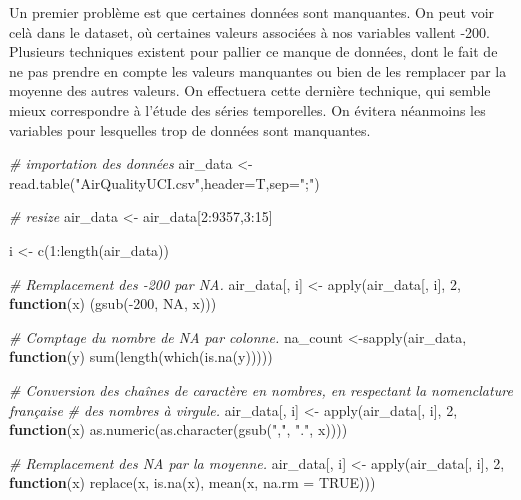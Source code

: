 \documentclass[
]{article}
\newenvironment{Shaded}{\begin{snugshade}}{\end{snugshade}}
\newcommand{\AttributeTok}[1]{\textcolor[rgb]{0.77,0.63,0.00}{#1}}
\newcommand{\CommentTok}[1]{\textcolor[rgb]{0.56,0.35,0.01}{\textit{#1}}}
\newcommand{\ConstantTok}[1]{\textcolor[rgb]{0.00,0.00,0.00}{#1}}
\newcommand{\ControlFlowTok}[1]{\textcolor[rgb]{0.13,0.29,0.53}{\textbf{#1}}}
\newcommand{\DecValTok}[1]{\textcolor[rgb]{0.00,0.00,0.81}{#1}}
\newcommand{\FunctionTok}[1]{\textcolor[rgb]{0.00,0.00,0.00}{#1}}
\newcommand{\NormalTok}[1]{#1}
\newcommand{\OtherTok}[1]{\textcolor[rgb]{0.56,0.35,0.01}{#1}}
\newcommand{\SpecialCharTok}[1]{\textcolor[rgb]{0.00,0.00,0.00}{#1}}
\newcommand{\StringTok}[1]{\textcolor[rgb]{0.31,0.60,0.02}{#1}}
\begin{document}
Un premier problème est que certaines données sont manquantes. On peut
voir celà dans le dataset, où certaines valeurs associées à nos
variables vallent -200. Plusieurs techniques existent pour pallier ce
manque de données, dont le fait de ne pas prendre en compte les valeurs
manquantes ou bien de les remplacer par la moyenne des autres valeurs.
On effectuera cette dernière technique, qui semble mieux correspondre à
l'étude des séries temporelles. On évitera néanmoins les variables pour
lesquelles trop de données sont manquantes.

\begin{Shaded}
\begin{Highlighting}[]
\CommentTok{\# importation des données}
\NormalTok{air\_data }\OtherTok{\textless{}{-}} \FunctionTok{read.table}\NormalTok{(}\StringTok{"AirQualityUCI.csv"}\NormalTok{,}\AttributeTok{header=}\NormalTok{T,}\AttributeTok{sep=}\StringTok{";"}\NormalTok{)}

\CommentTok{\# resize}
\NormalTok{air\_data }\OtherTok{\textless{}{-}}\NormalTok{ air\_data[}\DecValTok{2}\SpecialCharTok{:}\DecValTok{9357}\NormalTok{,}\DecValTok{3}\SpecialCharTok{:}\DecValTok{15}\NormalTok{]}

\NormalTok{i }\OtherTok{\textless{}{-}} \FunctionTok{c}\NormalTok{(}\DecValTok{1}\SpecialCharTok{:}\FunctionTok{length}\NormalTok{(air\_data))}

\CommentTok{\# Remplacement des {-}200 par NA.}
\NormalTok{air\_data[, i] }\OtherTok{\textless{}{-}} \FunctionTok{apply}\NormalTok{(air\_data[, i], }\DecValTok{2}\NormalTok{, }\ControlFlowTok{function}\NormalTok{(x) (}\FunctionTok{gsub}\NormalTok{(}\SpecialCharTok{{-}}\DecValTok{200}\NormalTok{, }\ConstantTok{NA}\NormalTok{, x)))}

\CommentTok{\# Comptage du nombre de NA par colonne.}
\NormalTok{na\_count }\OtherTok{\textless{}{-}}\FunctionTok{sapply}\NormalTok{(air\_data, }\ControlFlowTok{function}\NormalTok{(y) }\FunctionTok{sum}\NormalTok{(}\FunctionTok{length}\NormalTok{(}\FunctionTok{which}\NormalTok{(}\FunctionTok{is.na}\NormalTok{(y)))))}

\CommentTok{\# Conversion des chaînes de caractère en nombres, en respectant la nomenclature française }
\CommentTok{\# des nombres à virgule.}
\NormalTok{air\_data[, i] }\OtherTok{\textless{}{-}} \FunctionTok{apply}\NormalTok{(air\_data[, i], }\DecValTok{2}\NormalTok{, }
                       \ControlFlowTok{function}\NormalTok{(x) }\FunctionTok{as.numeric}\NormalTok{(}\FunctionTok{as.character}\NormalTok{(}\FunctionTok{gsub}\NormalTok{(}\StringTok{","}\NormalTok{, }\StringTok{"."}\NormalTok{, x))))}

\CommentTok{\# Remplacement des NA par la moyenne.}
\NormalTok{air\_data[, i] }\OtherTok{\textless{}{-}} \FunctionTok{apply}\NormalTok{(air\_data[, i], }\DecValTok{2}\NormalTok{, }
                       \ControlFlowTok{function}\NormalTok{(x) }\FunctionTok{replace}\NormalTok{(x, }\FunctionTok{is.na}\NormalTok{(x), }\FunctionTok{mean}\NormalTok{(x, }\AttributeTok{na.rm =} \ConstantTok{TRUE}\NormalTok{)))}
\end{Highlighting}
\end{Shaded}
\end{document}
